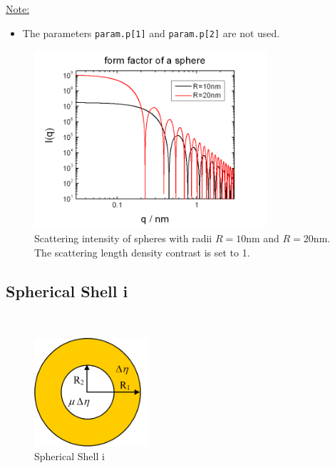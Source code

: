 \noindent\underline{Note:}
\begin{itemize}
\item The parameters \texttt{param.p[1]} and \texttt{param.p[2]} are not used.
\end{itemize}

\begin{figure}[htb]
\begin{center}
\includegraphics[width=0.768\textwidth,height=0.588\textwidth]{../images/form_factor/spheres/sphere_P.png}
\end{center}
\caption{Scattering intensity of spheres with radii $R=10$nm and $R=20$nm.
The scattering length density contrast is set to 1.} \label{fig:I_sphere}
\end{figure}

\clearpage

\subsection{Spherical Shell i}
\label{sect:spherical_shell_i} ~\\

\begin{figure}[htb]
\begin{center}
\includegraphics[width=0.38\textwidth,height=0.3575\textwidth]{../images/form_factor/spheres/shell1.png}
\end{center}
\caption{Spherical Shell i} \label{fig:shell1}
\end{figure}

